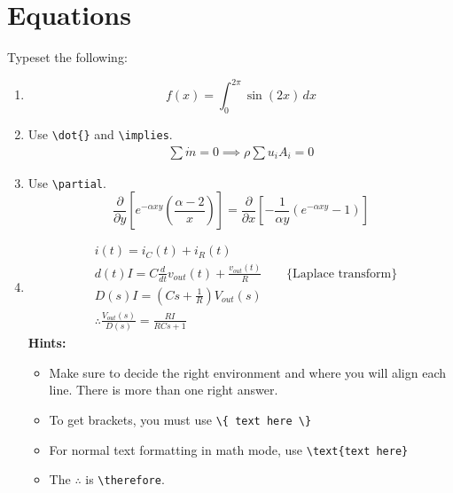\section{Equations}
Typeset the following:
\begin{enumerate}
    \item
        \begin{equation*}
            f(x) = \int_{0}^{2\pi} \sin(2x) \,dx
        \end{equation*}
    \item Use \verb|\dot{}| and \verb|\implies|.
        \begin{align*}
            \sum \dot{m} = 0 \implies \rho \sum u_i A_i = 0
        \end{align*}
    \item Use \verb|\partial|.
        \begin{equation*}
            \frac{\partial}{\partial y} \left[
                e^{-\alpha xy} \left( \frac{\alpha - 2}{x} \right)
            \right]
            =
            \frac{\partial}{\partial x} \left[
                -\frac{1}{\alpha y} \left(
                    e^{- \alpha xy} - 1
                \right)
            \right]
        \end{equation*}
    \item 
        \begin{align*}
            & i(t) = i_C(t) + i_R(t) \\
            & d(t)I = C \frac{d}{dt}v_{out}(t) + \frac{v_{out}(t)}{R} \qquad \{\text{Laplace transform}\} \\
            & D(s)I = \left( Cs + \frac{1}{R} \right)V_{out}(s) \\
            & \therefore \frac{V_{out}(s)}{D(s)} = \frac{RI}{RCs+1}
        \end{align*}
        \textbf{Hints:}
        \begin{itemize}
            \item Make sure to decide the right environment and where you will align each line. There is more than one right answer.
            \item To get brackets, you must use \verb|\{ text here \}|
            \item For normal text formatting in math mode, use \verb|\text{text here}|
            \item The \( \therefore \) is \verb|\therefore|.
        \end{itemize}
\end{enumerate}

